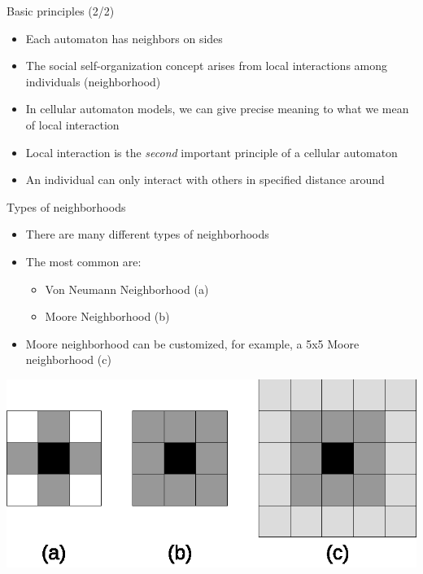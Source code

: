 \documentclass{beamer}
\begin{document}
\begin{frame}{Basic principles (2/2)}
\begin{itemize}
  \item Each automaton has neighbors on sides
  \item The social self-organization concept arises from local interactions among individuals (neighborhood)
  \item In cellular automaton models, we can give precise meaning to what we mean of local interaction
  \item Local interaction is the \emph{second} important principle of a cellular automaton
  \item An individual can only interact with others in specified distance around
\end{itemize}
\end{frame}

\begin{frame}{Types of neighborhoods}
\begin{itemize}
  \item There are many different types of neighborhoods
  \item The most common are:
  \begin{itemize}
    \item Von Neumann Neighborhood (a)
    \item Moore Neighborhood (b)
  \end{itemize}
  \item Moore neighborhood can be customized, for example, a 5x5 Moore neighborhood (c)
\end{itemize}
\begin{center}
  \includegraphics[scale=0.50]{images/neighbourhood}
\end{center}
\end{frame}
\end{document}

